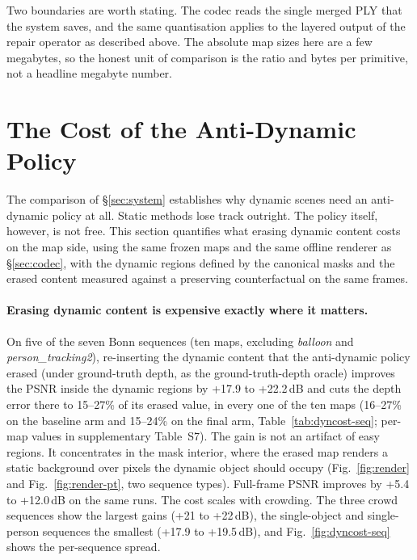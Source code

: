 \documentclass[10pt,twocolumn,letterpaper]{article}
\newcommand{\gate}[1]{{#1}} %
\begin{document}
Two boundaries are worth stating. The codec reads the single merged PLY that the
system saves, and the same quantisation applies to the layered output of the repair
operator as described above. The absolute map sizes here are a few megabytes, so the
honest unit of comparison is the ratio and bytes per primitive, not a headline
megabyte number.

\section{The Cost of the Anti-Dynamic Policy}
\label{sec:dyncost}

The comparison of \S\ref{sec:system} establishes why dynamic scenes need an anti-dynamic policy at
all. Static methods lose track outright. The policy itself, however, is not
free. This section quantifies what erasing dynamic content costs on the map side, using
the same frozen maps and the same offline renderer as \S\ref{sec:codec}, with the
dynamic regions defined by the canonical masks and the erased content measured against a
preserving counterfactual on the same frames.

\paragraph{Erasing dynamic content is expensive exactly where it matters.}
On five of the seven Bonn sequences (ten maps, excluding \emph{balloon} and \emph{person\_tracking2}),
re-inserting the dynamic content that the
anti-dynamic policy erased (under ground-truth depth, as the ground-truth-depth oracle) improves the PSNR inside the dynamic regions by
\gate{+17.9} to \gate{+22.2}\,dB and cuts the depth error there to \gate{15--27\%} of
its erased value, in every one of the ten maps (\gate{16--27\%} on the baseline arm
and \gate{15--24\%} on the final arm, Table~\ref{tab:dyncost-seq}; per-map values in supplementary
Table~S7). %
 The gain is not an artifact of easy regions. It concentrates in the mask interior,
where the erased map renders a static background over pixels the dynamic object should
occupy (Fig.~\ref{fig:render} and Fig.~\ref{fig:render-pt}, two sequence types). Full-frame
PSNR improves by \gate{+5.4} to
\gate{+12.0}\,dB on the same runs. The cost scales with crowding. The three crowd sequences show the
largest gains (\gate{+21} to \gate{+22}\,dB), the single-object and single-person
sequences the smallest (\gate{+17.9} to \gate{+19.5}\,dB), %
and Fig.~\ref{fig:dyncost-seq} shows the per-sequence spread.
\end{document}
